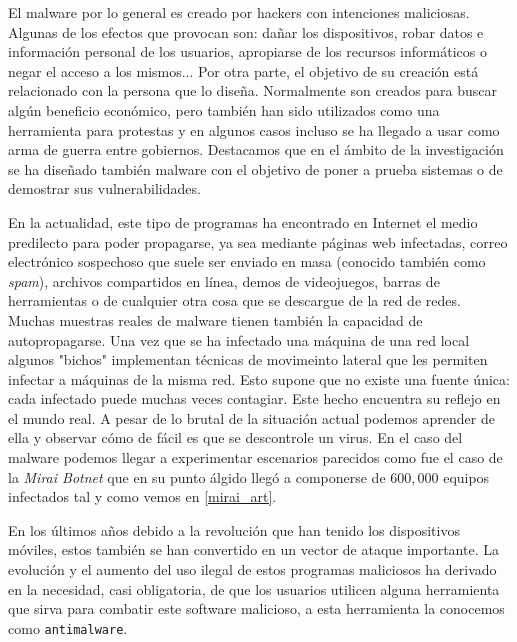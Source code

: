 \documentclass[12pt]{article}
\newcommand{\newpar} {
    \vskip 0.5cm
}
\begin{document}
        \newpar

        El malware por lo general es creado por hackers con intenciones maliciosas. Algunas de los efectos que provocan son: dañar los dispositivos, robar datos e información personal de los usuarios, apropiarse de los recursos informáticos o negar el acceso a los mismos... Por otra parte, el objetivo de su creación está relacionado con la persona que lo diseña. Normalmente son creados para buscar algún beneficio económico, pero también han sido utilizados como una herramienta para protestas y en algunos casos incluso se ha llegado a usar como arma de guerra entre gobiernos. Destacamos que en el ámbito de la investigación se ha diseñado también malware con el objetivo de poner a prueba sistemas o de demostrar sus vulnerabilidades.

        \newpar

        En la actualidad, este tipo de programas ha encontrado en Internet el medio predilecto para poder propagarse, ya sea mediante páginas web infectadas, correo electrónico sospechoso que suele ser enviado en masa (conocido también como \textit{spam}), archivos compartidos en línea, demos de videojuegos, barras de herramientas o de cualquier otra cosa que se descargue de la red de redes. Muchas muestras reales de malware tienen también la capacidad de autopropagarse. Una vez que se ha infectado una máquina de una red local algunos "bichos" implementan técnicas de movimeinto lateral que les permiten infectar a máquinas de la misma red. Esto supone que no existe una fuente única: cada infectado puede muchas veces contagiar. Este hecho encuentra su reflejo en el mundo real. A pesar de lo brutal de la situación actual podemos aprender de ella y observar cómo de fácil es que se descontrole un virus. En el caso del malware podemos llegar a experimentar escenarios parecidos como fue el caso de la \textit{Mirai Botnet} que en su punto álgido llegó a componerse de $600,000$ equipos infectados tal y como vemos en \ref{mirai_art}.

        \newpar

        En los últimos años debido a la revolución que han tenido los dispositivos móviles, estos también se han convertido en un vector de ataque importante. La evolución y el aumento del uso ilegal de estos programas maliciosos ha derivado en la necesidad, casi obligatoria, de que los usuarios utilicen alguna herramienta que sirva para combatir este software malicioso, a esta herramienta la conocemos como \texttt{antimalware}.
\end{document}
